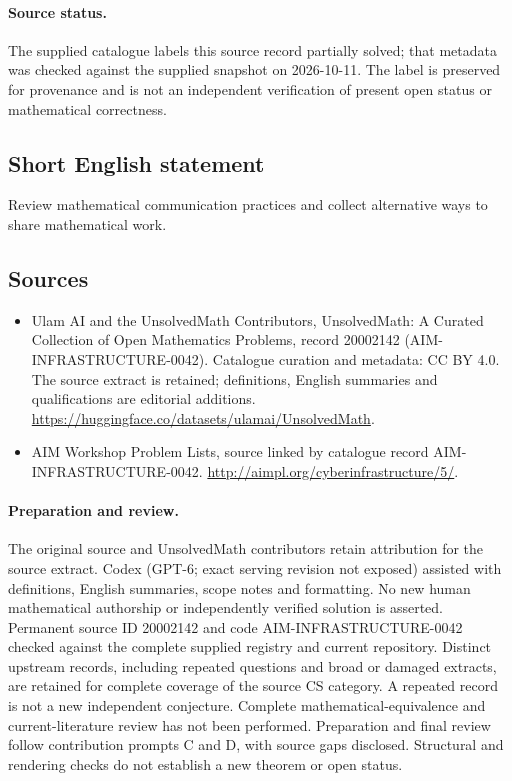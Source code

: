 \documentclass[11pt]{article}
\begin{document}
\paragraph{Source status.}
The supplied catalogue labels this source record partially solved; that metadata was checked against the supplied snapshot on 2026-10-11. The label is preserved for provenance and is not an independent verification of present open status or mathematical correctness.
\subsection{Short English statement}
Review mathematical communication practices and collect alternative ways to share mathematical work.
\subsection{Sources}
\begin{itemize}
\item[\hypertarget{source:20002142:1}{S1}] Ulam AI and the UnsolvedMath Contributors, UnsolvedMath: A Curated Collection of Open Mathematics Problems, record 20002142 (AIM-INFRASTRUCTURE-0042). Catalogue curation and metadata: CC BY 4.0. The source extract is retained; definitions, English summaries and qualifications are editorial additions.
\url{https://huggingface.co/datasets/ulamai/UnsolvedMath}.
\item[\hypertarget{source:20002142:2}{S2}] AIM Workshop Problem Lists, source linked by catalogue record AIM-INFRASTRUCTURE-0042.
\url{http://aimpl.org/cyberinfrastructure/5/}.
\end{itemize}
\paragraph{Preparation and review.}
The original source and UnsolvedMath contributors retain attribution for the source extract. Codex (GPT-6; exact serving revision not exposed) assisted with definitions, English summaries, scope notes and formatting. No new human mathematical authorship or independently verified solution is asserted. Permanent source ID 20002142 and code AIM-INFRASTRUCTURE-0042 checked against the complete supplied registry and current repository. Distinct upstream records, including repeated questions and broad or damaged extracts, are retained for complete coverage of the source CS category. A repeated record is not a new independent conjecture. Complete mathematical-equivalence and current-literature review has not been performed. Preparation and final review follow contribution prompts C and D, with source gaps disclosed. Structural and rendering checks do not establish a new theorem or open status.
\label{end:20002142}
\end{document}
